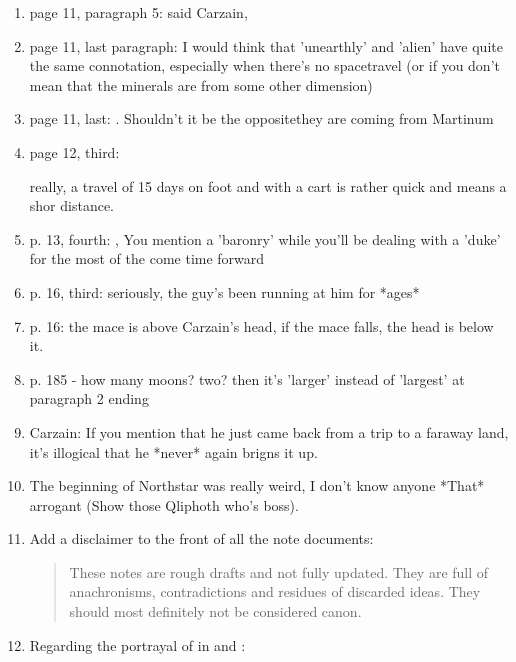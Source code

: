 \begin{enumerate}
  \item 
    page 11, paragraph 5: 
     said Carzain, 
  \item 
    page 11, last paragraph:  I would think that 'unearthly' and 'alien' have quite the same connotation, especially when there's no spacetravel (or if you don't mean that the minerals are from some other dimension)
  \item 
    page 11, last: 
    .  Shouldn't it be the opposite\dash they are coming from Martinum
  \item 
    page 12, third: 
    
    really, a travel of 15 days on foot and with a cart is rather quick and means a shor distance.
  \item 
    p. 13, fourth: , You mention a 'baronry' while you'll be dealing with a 'duke' for the most of the come time forward\prikker 
  \item 
    p. 16, third:  seriously, the guy's been running at him for *ages*
  \item 
    p. 16: the mace is above Carzain's head, if the mace falls, the head is below it.
  \item 
    p. 185 - how many moons? two? then it's 'larger' instead of 'largest' at paragraph 2 ending
  \item 
    Carzain: If you mention that he just came back from a trip to a faraway land, it's illogical that he *never* again brigns it up. 
  \item 
    The beginning of Northstar was really weird, I don't know anyone *That* arrogant (Show those Qliphoth who's boss). 
  \item 
    Add a disclaimer to the front of all the note documents:
    \begin{quotation}
      These notes are rough drafts and not fully updated. 
      They are full of anachronisms, contradictions and residues of discarded ideas. 
      They should most definitely not be considered canon. 
    \end{quotation}
  \item 
    Regarding the portrayal of \resphain in  and : 
    

\end{enumerate}
